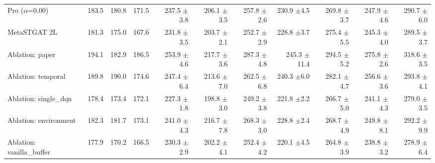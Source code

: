 \begin{table}
\begin{tabular}{@{}lrrrrrrrrrr@{}}
    Pro ($\alpha$=0.00)       & 183.5   & 180.8   & 171.5   & 237.5 {\fontsize{4}{4}\selectfont$\pm$3.8} & 206.1 {\fontsize{4}{4}\selectfont$\pm$3.5} & 257.8 {\fontsize{4}{4}\selectfont$\pm$2.6} & 230.9 {\fontsize{4}{4}\selectfont$\pm$4.5}  & 269.8 {\fontsize{4}{4}\selectfont$\pm$3.7} & 247.9 {\fontsize{4}{4}\selectfont$\pm$4.6} & 290.7 {\fontsize{4}{4}\selectfont$\pm$6.0} \\
    MetaSTGAT 2L              & 181.3   & 175.0   & 167.6   & 231.8 {\fontsize{4}{4}\selectfont$\pm$3.5} & 203.7 {\fontsize{4}{4}\selectfont$\pm$2.1} & 252.7 {\fontsize{4}{4}\selectfont$\pm$2.9} & 228.8 {\fontsize{4}{4}\selectfont$\pm$3.7}  & 275.4 {\fontsize{4}{4}\selectfont$\pm$5.5} & 245.3 {\fontsize{4}{4}\selectfont$\pm$4.0} & 289.5 {\fontsize{4}{4}\selectfont$\pm$3.7} \\
    Ablation: paper           & 194.1   & 182.9   & 186.5   & 253.9 {\fontsize{4}{4}\selectfont$\pm$4.6} & 217.7 {\fontsize{4}{4}\selectfont$\pm$3.6} & 287.3 {\fontsize{4}{4}\selectfont$\pm$4.8} & 245.3 {\fontsize{4}{4}\selectfont$\pm$11.4} & 294.5 {\fontsize{4}{4}\selectfont$\pm$5.2} & 275.8 {\fontsize{4}{4}\selectfont$\pm$2.6} & 318.6 {\fontsize{4}{4}\selectfont$\pm$3.5} \\
    Ablation: temporal        & 189.8   & 190.0   & 174.6   & 247.4 {\fontsize{4}{4}\selectfont$\pm$6.4} & 213.6 {\fontsize{4}{4}\selectfont$\pm$7.0} & 262.5 {\fontsize{4}{4}\selectfont$\pm$6.8} & 240.3 {\fontsize{4}{4}\selectfont$\pm$6.0}  & 282.1 {\fontsize{4}{4}\selectfont$\pm$4.7} & 256.6 {\fontsize{4}{4}\selectfont$\pm$3.6} & 293.8 {\fontsize{4}{4}\selectfont$\pm$4.1} \\
    Ablation: single\_dqn     & 178.4   & 173.4   & 172.1   & 227.3 {\fontsize{4}{4}\selectfont$\pm$1.8} & 198.8 {\fontsize{4}{4}\selectfont$\pm$3.0} & 249.2 {\fontsize{4}{4}\selectfont$\pm$3.8} & 221.8 {\fontsize{4}{4}\selectfont$\pm$2.2}  & 266.7 {\fontsize{4}{4}\selectfont$\pm$5.0} & 241.1 {\fontsize{4}{4}\selectfont$\pm$4.3} & 279.0 {\fontsize{4}{4}\selectfont$\pm$3.5} \\
    Ablation: environment     & 182.3   & 181.7   & 173.1   & 241.0 {\fontsize{4}{4}\selectfont$\pm$4.3} & 216.7 {\fontsize{4}{4}\selectfont$\pm$7.8} & 268.3 {\fontsize{4}{4}\selectfont$\pm$3.0} & 228.8 {\fontsize{4}{4}\selectfont$\pm$2.4}  & 268.7 {\fontsize{4}{4}\selectfont$\pm$4.9} & 249.8 {\fontsize{4}{4}\selectfont$\pm$8.1} & 292.2 {\fontsize{4}{4}\selectfont$\pm$9.9} \\
    Ablation: vanilla\_buffer & 177.9   & 170.2   & 166.5   & 230.3 {\fontsize{4}{4}\selectfont$\pm$2.9} & 202.2 {\fontsize{4}{4}\selectfont$\pm$4.1} & 252.4 {\fontsize{4}{4}\selectfont$\pm$4.2} & 220.1 {\fontsize{4}{4}\selectfont$\pm$4.5}  & 264.8 {\fontsize{4}{4}\selectfont$\pm$3.9} & 238.8 {\fontsize{4}{4}\selectfont$\pm$3.2} & 278.9 {\fontsize{4}{4}\selectfont$\pm$6.4} \\

\end{tabular}
\end{table}
